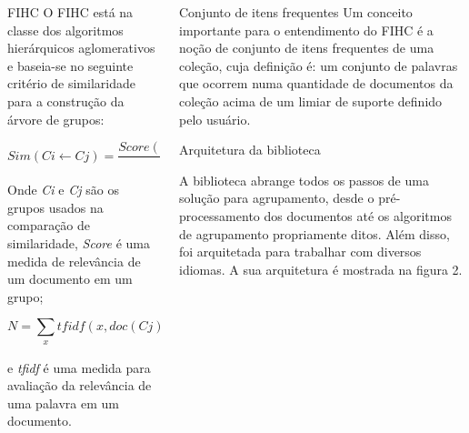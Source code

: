 \documentclass[final]{beamer}
\newlength{\onecolwid}
\newlength{\twocolwid}
\begin{document}
\begin{frame}[t]
\begin{columns}[t]
\begin{column}{\twocolwid}
\begin{columns}[t,totalwidth=\twocolwid]
\begin{column}{\onecolwid}
\begin{block}{FIHC}
O FIHC está na classe dos algoritmos hierárquicos aglomerativos e baseia-se no seguinte critério de similaridade para a construção da árvore de grupos:

\begin{equation}
Sim(Ci \gets Cj) = \frac{Score(Ci \gets doc(Cj))}{N} + 1
\label{eqn:Sim}
\end{equation}

Onde \textit{Ci} e \textit{Cj} são os grupos usados na comparação de similaridade, \textit{Score} é uma medida de relevância de um documento em um grupo;

\begin{equation}
N = \sum_{x}tfidf(x, doc(Cj)) + \sum_{x'}tfidf(x', doc(Cj))
\label{eqn:Sim_N}
\end{equation}

e \textit{tfidf} é uma medida para avaliação da relevância de uma palavra em um documento.

\end{block}


\end{column} %

\begin{column}{\onecolwid}\vspace{-.6in} %


\begin{block}{Conjunto de itens frequentes}
Um conceito importante para o entendimento do FIHC é a noção de conjunto de itens frequentes de uma coleção, cuja definição é: um conjunto de palavras que ocorrem numa quantidade de documentos da coleção acima de um limiar de suporte definido pelo usuário.
\end{block}

\begin{block}{Arquitetura da biblioteca}

A biblioteca abrange todos os passos de uma solução para agrupamento, desde o pré-processamento dos documentos até os algoritmos de agrupamento propriamente ditos. Além disso, foi arquitetada para trabalhar com diversos idiomas. A sua arquitetura é mostrada na figura 2.


\end{block}
\end{column}
\end{columns}
\end{column}
\end{columns}
\end{frame}
\end{document}
